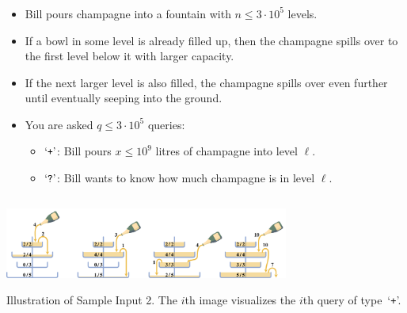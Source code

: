 \begin{frame}
    \frametitle{\problemtitle}

    \begin{columns}
        \begin{column}[T]{.67\textwidth}
            \begin{itemize}
                \item Bill pours champagne into a fountain with $n \leq 3\cdot 10^5$ levels.
                \item If a bowl in some level is already filled up, then the champagne spills over to
                the first level below it with larger capacity.
                \item If the next larger level is also filled, the champagne spills over even further until eventually seeping into the ground.
                \item You are asked $q\leq 3\cdot 10^5$ queries:
                \begin{itemize}
                    \normalsize
                    \item $\text{`\texttt{+}'}$: Bill pours $x\leq 10^9$ litres of champagne into level $\ell$.
                    \item $\text{`\texttt{?}'}$: Bill wants to know how much champagne is in level $\ell$.
                \end{itemize}
            \end{itemize}
        \end{column}

    \end{columns}


    \centering
    \includegraphics[width=0.7\textwidth]{sample.pdf}

    \small
    Illustration of Sample Input 2.
    The $i$th image visualizes the $i$th query of type~`\texttt{+}'.
\end{frame}
